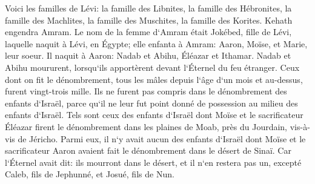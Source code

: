 \verse Voici les familles de Lévi: la famille des Libnites, la famille des Hébronites, la famille des Machlites, la famille des Muschites, la famille des Korites. Kehath engendra Amram. 
\verse Le nom de la femme d`Amram était Jokébed, fille de Lévi, laquelle naquit à Lévi, en Égypte; elle enfanta à Amram: Aaron, Moïse, et Marie, leur soeur. 
\verse Il naquit à Aaron: Nadab et Abihu, Éléazar et Ithamar. 
\verse Nadab et Abihu moururent, lorsqu`ils apportèrent devant l`Éternel du feu étranger. 
\verse Ceux dont on fit le dénombrement, tous les mâles depuis l`âge d`un mois et au-dessus, furent vingt-trois mille. Ils ne furent pas compris dans le dénombrement des enfants d`Israël, parce qu`il ne leur fut point donné de possession au milieu des enfants d`Israël. 
\verse Tels sont ceux des enfants d`Israël dont Moïse et le sacrificateur Éléazar firent le dénombrement dans les plaines de Moab, près du Jourdain, vis-à-vis de Jéricho. 
\verse Parmi eux, il n`y avait aucun des enfants d`Israël dont Moïse et le sacrificateur Aaron avaient fait le dénombrement dans le désert de Sinaï. 
\verse Car l`Éternel avait dit: ils mourront dans le désert, et il n`en restera pas un, excepté Caleb, fils de Jephunné, et Josué, fils de Nun. 

\chapter{}

